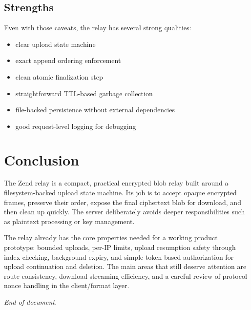 \documentclass[11pt,a4paper]{report}
\begin{document}
\section{Strengths}

Even with those caveats, the relay has several strong qualities:

\begin{itemize}[leftmargin=1.5cm]
    \item clear upload state machine
    \item exact append ordering enforcement
    \item clean atomic finalization step
    \item straightforward TTL-based garbage collection
    \item file-backed persistence without external dependencies
    \item good request-level logging for debugging
\end{itemize}

\chapter{Conclusion}

The Zend relay is a compact, practical encrypted blob relay built around a filesystem-backed upload state machine. Its job is to accept opaque encrypted frames, preserve their order, expose the final ciphertext blob for download, and then clean up quickly. The server deliberately avoids deeper responsibilities such as plaintext processing or key management.

The relay already has the core properties needed for a working product prototype: bounded uploads, per-IP limits, upload resumption safety through index checking, background expiry, and simple token-based authorization for upload continuation and deletion. The main areas that still deserve attention are route consistency, download streaming efficiency, and a careful review of protocol nonce handling in the client/format layer.

\vfill
\begin{center}
    \textit{End of document.}
\end{center}
\end{document}
